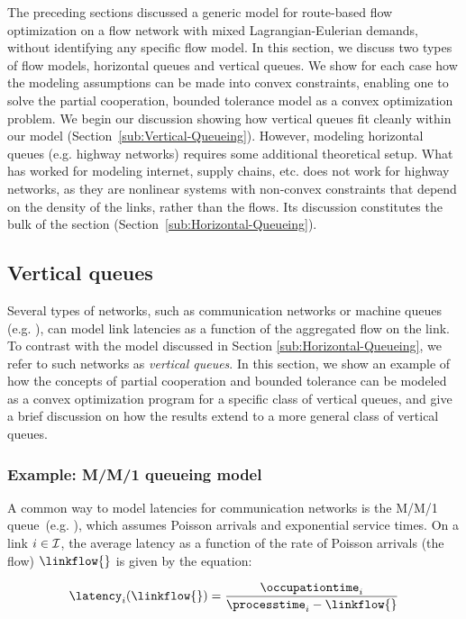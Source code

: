 The preceding sections discussed a generic model for route-based flow
optimization on a flow network with mixed Lagrangian-Eulerian demands,
without identifying any specific flow model. In this section, we discuss
two types of flow models, horizontal queues and vertical queues. We
show for each case how the modeling assumptions can be made into convex
constraints, enabling one to solve the partial cooperation, bounded
tolerance model as a convex optimization problem. We begin our discussion
showing how vertical queues fit cleanly within our model (Section~\ref{sub:Vertical-Queueing}).
However, modeling horizontal queues (e.g. highway networks) requires
some additional theoretical setup. What has worked for modeling internet,
supply chains, etc. does not work for highway networks, as they are
nonlinear systems with non-convex constraints that depend on the density
of the links, rather than the flows. Its discussion constitutes the
bulk of the section (Section~\ref{sub:Horizontal-Queueing}).


\subsection{Vertical queues\label{sub:Vertical-Queueing}}

Several types of networks, such as communication networks or machine
queues (e.g. \cite{roughgarden2001stackelberg}), can model link
latencies as a function of the aggregated flow on the link. To contrast
with the model discussed in Section \ref{sub:Horizontal-Queueing},
we refer to such networks as \emph{vertical queues}. In this section,
we show an example of how the concepts of partial cooperation and
bounded tolerance can be modeled as a convex optimization program
for a specific class of vertical queues, and give a brief discussion
on how the results extend to a more general class of vertical queues.


\subsubsection{Example: M/M/1 queueing model\label{sub:M/M/1-Queueing-Model}}

A common way to model latencies for communication networks is the
M/M/1 queue~(e.g. \cite{aswani2011game}), which assumes Poisson
arrivals and exponential service times. On a link $i\in\mathcal{I}$,
the average latency as a function of the rate of Poisson arrivals
(the flow) $\linkflow{}$ is given by the equation:

\begin{equation}
\latency_{\link}\left(\linkflow{}\right)=\frac{\occupationtime_{\link}}{\processtime_{\link}-\linkflow{}}\label{eq:vq}
\end{equation}


